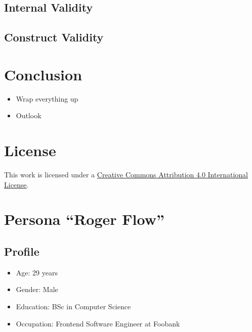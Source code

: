 \documentclass[sigplan,screen,nonacm,review]{acmart}
\begin{document}
\subsection{Internal Validity}

\subsection{Construct Validity}

\section{Conclusion}
\label{sec:conclusion}

\begin{itemize}
	\item Wrap everything up
	\item Outlook
\end{itemize}


\section*{License}
\ccby\thinspace\thinspace This work is licensed under a \href{https://creativecommons.org/licenses/by/4.0/}{Creative Commons Attribution 4.0 International License}.

\appendix





\section{Persona ``Roger Flow''}
\label{sec:persona}

\subsection{Profile}
\begin{itemize}
	\item Age: 29 years
	\item Gender: Male
	\item Education: BSc in Computer Science
	\item Occupation: Frontend Software Engineer at Foobank
\end{itemize}
\end{document}
